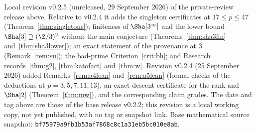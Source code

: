 \par\noindent\small Local revision v0.2.5 (unreleased, 29 September 2026) of the private-review release above. Relative to v0.2.4 it adds the singleton certificates at $17\le p\le47$ (Theorem~\ref{thm:singletons}); finiteness of $\Sha[3^\infty]$ and the lower bound $\Sha[3]\supseteq(\Z/3)^2$ without the main conjecture (Theorems~\ref{thm:sha3fin} and~\ref{thm:sha3lower}); an exact statement of the provenance at $3$ (Remark~\ref{rem:su}); the bad-prime Criterion~\ref{crit:bh}; and Research records~\ref{thm:g2}, \ref{thm:katofact} and~\ref{thm:w}. Revision v0.2.4 (25 September 2026) added Remarks~\ref{rem:a4lean} and~\ref{rem:a5lean} (formal checks of the deductions at $p=3,5,7,11,13$), an exact descent certificate for the rank and $\Sha[2]$ (Theorem~\ref{thm:mw}), and the corresponding claim grades. The date and tag above are those of the base release v0.2.2; this revision is a local working copy, not yet published, with no tag or snapshot link. Base mathematical source snapshot: \nolinkurl{bf75979a9fb1b53af7868c8c1a31eb5bc010e8ab}.\normalsize
